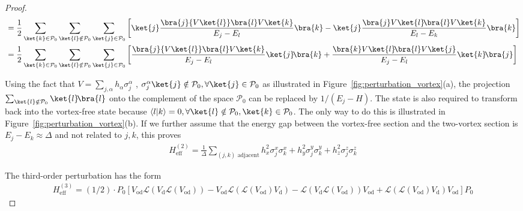 \begin{proof}
\begin{align}
     &=\frac{1}{2}\sum_{\ket{k} \in \mathcal{P}_0 }\sum_{\ket{l} \notin \mathcal{P}_0}\sum_{\ket{j} \in \mathcal{P}_0 }\left[\ket{j}\frac{\bra{j}{V\ket{l}}\bra{l}V\ket{k}}{E_j - E_l}\bra{k} - \ket{j}\frac{\bra{j}V{\ket{l}\!\bra{l}V}\ket{k}}{E_l- E_k}\bra{k}\right]\\
      &=\frac{1}{2}\sum_{\ket{k} \in \mathcal{P}_0 }\sum_{\ket{l} \notin \mathcal{P}_0}\sum_{\ket{j} \in \mathcal{P}_0 }\left[\frac{\bra{j}{V\ket{l}}\bra{l}V\ket{k}}{E_j - E_l}\ket{j}\!\bra{k} + \frac{\bra{k}V{\ket{l}\!\bra{l}V}\ket{j}}{E_j- E_l}\ket{k}\!\bra{j}\right]
\end{align}

Using the fact that $V = \sum_{j, \alpha} h_{\alpha}\sigma_j^{\alpha}$ , $\sigma_{j}^{\alpha}\ket{j} \notin \mathcal{P}_0, \forall \ket{j} \in \mathcal{P}_0$ as illustrated in Figure~\ref{fig:perturbation_vortex}(a), the projection $\sum_{\ket{l} \notin \mathcal{P}_0}\ket{l}\!\bra{l}$ onto the complement of the space $\mathcal{P}_0$ can be replaced by ${1}/{(E_j - H)}$. 
The state is also required to transform back into the vortex-free state because $\langle l | k\rangle =0 , \forall \ket{l}\notin \mathcal{P}_0, \ket{k} \in \mathcal{P}_0$. The only way to do this is illustrated in Figure~\ref{fig:perturbation_vortex}(b). If we further assume that the energy gap between the vortex-free section and the two-vortex section is  $E_j - E_k \approx \Delta $  and not related to $j,k$, this proves
\begin{align}
    H_{\mathrm{eff}}^{(2)} = \frac{1}{\Delta}\sum_{(j,k) \text{~adjacent}} h_x^2\sigma_j^x \sigma_k^x+h_y^2\sigma_j^y \sigma_k^y+h_z^2\sigma_j^z \sigma_k^z
\end{align}

The third-order perturbation has the form
\begin{align}
    H_{\mathrm{eff}}^{(3)} = (1/2)\cdot P_0 \left[V_{\mathrm{od}} \mathcal{L}(V_{\mathrm{d}}\mathcal{L}(V_{\mathrm{od}})) - V_{\mathrm{od}} \mathcal{L}(\mathcal{L}(V_{\mathrm{od}})V_{\mathrm{d}})-\mathcal{L}(V_{\mathrm{d}} \mathcal{L}(V_{\mathrm{od}}))V_{\mathrm{od}} + \mathcal{L}(\mathcal{L}(V_{\mathrm{od}})V_{\mathrm{d}})V_{\mathrm{od}}\right]P_0
\end{align}


\end{proof}
